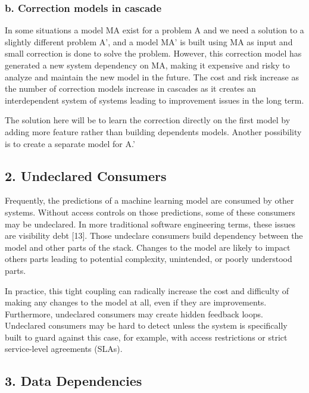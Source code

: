 \documentclass[]{article}
\begin{document}
\subsubsection{b. Correction models in
cascade}\label{b.-correction-models-in-cascade}

In some situations a model MA exist for a problem A and we need a
solution to a slightly different problem A', and a model MA' is built
using MA as input and small correction is done to solve the problem.
However, this correction model has generated a new system dependency on
MA, making it expensive and risky to analyze and maintain the new model
in the future. The cost and risk increase as the number of correction
models increase in cascades as it creates an interdependent system of
systems leading to improvement issues in the long term.

The solution here will be to learn the correction directly on the first
model by adding more feature rather than building dependents models.
Another possibility is to create a separate model for A.'

\subsection{2. Undeclared Consumers}\label{undeclared-consumers}

Frequently, the predictions of a machine learning model are consumed by
other systems. Without access controls on those predictions, some of
these consumers may be undeclared. In more traditional software
engineering terms, these issues are visibility debt {[}13{]}. Those
undeclare consumers build dependency between the model and other parts
of the stack. Changes to the model are likely to impact others parts
leading to potential complexity, unintended, or poorly understood parts.

In practice, this tight coupling can radically increase the cost and
difficulty of making any changes to the model at all, even if they are
improvements. Furthermore, undeclared consumers may create hidden
feedback loops. Undeclared consumers may be hard to detect unless the
system is specifically built to guard against this case, for example,
with access restrictions or strict service-level agreements (SLAs).

\subsection{3. Data Dependencies}\label{data-dependencies}
\end{document}

